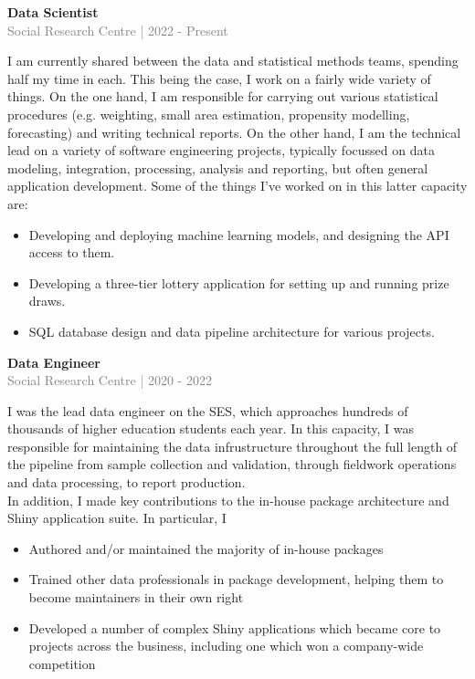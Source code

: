 \documentclass[10pt]{article}
\begin{document}
{\bf Data Scientist} \\
\textcolor{gray}{Social Research Centre | 2022 - Present} \\[3pt]
\begin{small}
  I am currently shared between the data and statistical methods teams, spending half my time
  in each. This being the case, I work on a fairly wide variety of things.
  On the one hand, I am responsible for carrying out various statistical procedures (e.g.
  weighting, small area estimation, propensity modelling, forecasting) and writing technical reports.
  On the other hand, I am the technical lead on a variety of software engineering projects,
  typically focussed on data modeling, integration, processing, analysis and reporting, but often general
  application development. Some of the things I've worked on in this latter capacity are:

\begin{itemize}
  \item Developing and deploying machine learning models, and designing the API access to them.
  \item Developing a three-tier lottery application for setting up and running prize draws.
  \item SQL database design and data pipeline architecture for various projects.
\end{itemize}

\end{small}

\vspace{0.5cm}
{\bf Data Engineer} \\
\textcolor{gray}{Social Research Centre | 2020 - 2022} \\[3pt]
\begin{small}
I was the lead data engineer on the SES, which approaches hundreds of thousands of higher education students each year. In this capacity, I was responsible for maintaining the data infrustructure throughout the full length of the pipeline from sample collection and validation, through fieldwork operations and data processing, to report production.
\\

In addition, I made key contributions to the in-house package architecture and Shiny application suite. In particular, I

\begin{itemize}
  \item Authored and/or maintained the majority of in-house packages
  \item Trained other data professionals in package development, helping them to become maintainers in their own right
  \item Developed a number of complex Shiny applications which became core to projects across the business, including one which won a company-wide competition
\end{itemize}
\end{small}
\end{document}
